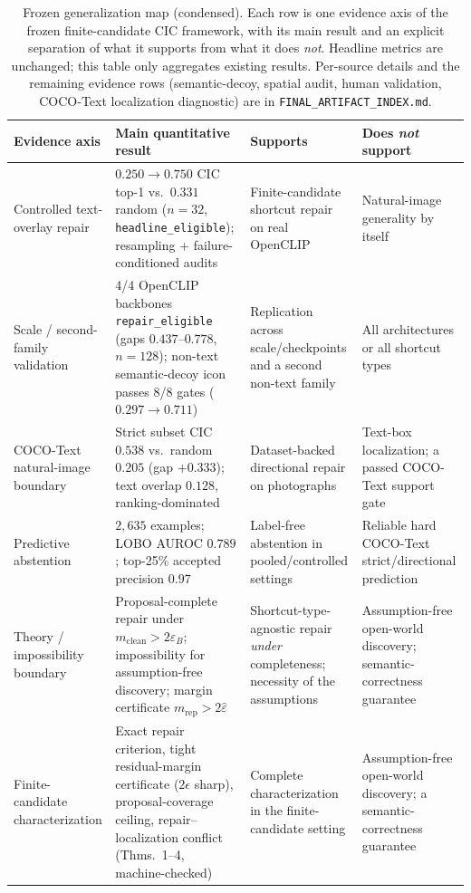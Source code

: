 \documentclass[11pt]{article}
\begin{document}
\begin{table}[t]
\centering
\caption{Frozen generalization map (condensed). Each row is one evidence axis of the
frozen finite-candidate CIC framework, with its main result and an explicit separation
of what it supports from what it does \emph{not}. Headline metrics are unchanged; this
table only aggregates existing results. Per-source details and the remaining
evidence rows (semantic-decoy, spatial audit, human validation, COCO-Text localization
diagnostic) are in \texttt{FINAL\_ARTIFACT\_INDEX.md}.}
\label{tab:frozenmap}
\small
\setlength{\tabcolsep}{4pt}
\renewcommand{\arraystretch}{1.2}
\begin{tabular}{p{2.6cm}p{4.1cm}p{3.0cm}p{3.0cm}}
\toprule
Evidence axis & Main quantitative result & Supports & Does \emph{not} support \\
\midrule
Controlled text-overlay repair &
$0.250\to0.750$ CIC top-1 vs.\ $0.331$ random ($n{=}32$, \texttt{headline\_eligible});
resampling + failure-conditioned audits &
Finite-candidate shortcut repair on real OpenCLIP &
Natural-image generality by itself \\
\midrule
Scale / second-family validation &
4/4 OpenCLIP backbones \texttt{repair\_eligible} (gaps $0.437$--$0.778$, $n{=}128$);
non-text semantic-decoy icon passes 8/8 gates ($0.297\to0.711$) &
Replication across scale/checkpoints and a second non-text family &
All architectures or all shortcut types \\
\midrule
COCO-Text natural-image boundary &
Strict subset CIC $0.538$ vs.\ random $0.205$ (gap $+0.333$); text overlap $0.128$,
ranking-dominated &
Dataset-backed directional repair on photographs &
Text-box localization; a passed COCO-Text support gate \\
\midrule
Predictive abstention &
$2{,}635$ examples; LOBO AUROC $0.789$; top-25\% accepted precision $0.97$ &
Label-free abstention in pooled/controlled settings &
Reliable hard COCO-Text strict/directional prediction \\
\midrule
Theory / impossibility boundary &
Proposal-complete repair under $m_{\text{clean}}>2\varepsilon_B$; impossibility for
assumption-free discovery; margin certificate $m_{\text{rep}}>2\hat\varepsilon$ &
Shortcut-type-agnostic repair \emph{under} completeness; necessity of the assumptions &
Assumption-free open-world discovery; semantic-correctness guarantee \\
\midrule
Finite-candidate characterization &
Exact repair criterion, tight residual-margin certificate ($2\epsilon$ sharp),
proposal-coverage ceiling, repair--localization conflict (Thms.~1--4, machine-checked) &
Complete characterization in the finite-candidate setting &
Assumption-free open-world discovery; a semantic-correctness guarantee \\
\bottomrule
\end{tabular}
\end{table}
\end{document}
